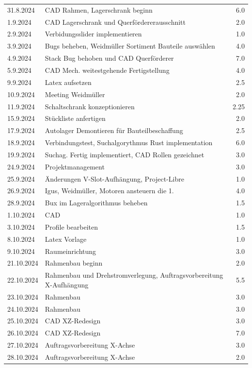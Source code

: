 \begin{longtable}{|l|p{10cm}|r|}
31.8.2024	&CAD Rahmen, Lagerschrank beginn	&6.0\\
1.9.2024	&CAD Lagerschrank und Querfördererausschnitt	&2.0\\
2.9.2024	&Verbidungsslider implementieren	&1.0\\
3.9.2024	&Bugs beheben, Weidmüller Sortiment Bauteile auswählen	&4.0\\
4.9.2024	&Stack Bug behoben und CAD Querförderer	&7.0\\
5.9.2024	&CAD Mech. weitestgehende Fertigstellung	&4.0\\
9.9.2024	&Latex aufsetzen	&2.5\\
10.9.2024	&Meeting Weidmüller&	2.0	\\
11.9.2024	&Schaltschrank konzeptionieren &2.25\\
15.9.2024	&Stückliste anfertigen	&2.0\\

17.9.2024	&Autolager Demontieren für Bauteilbeschaffung&	2.5\\
18.9.2024	&Verbindungstest, Suchalgorythmus Rust implementation &6.0\\
19.9.2024	&Suchag. Fertig implementiert, CAD Rollen gezeichnet	&3.0\\

24.9.2024	&Projektmanagement&	3.0\\
25.9.2024	&Änderungen V-Slot-Aufhängung, Project-Libre	&1.0\\

26.9.2024	&Igus, Weidmüller, Motoren ansteuern die 1.&	4.0\\
28.9.2024	&Bux im Lageralgorithmus beheben	&1.5\\

1.10.2024	&CAD	&1.0\\
3.10.2024	&Profile bearbeiten	&1.5\\
8.10.2024	&Latex Vorlage	&1.0\\
9.10.2024	&Raumeinrichtung&	3.0\\
21.10.2024	&Rahmenbau beginn&	2.0\\
22.10.2024	&Rahmenbau und Drehstromverlegung, Auftragsvorbereitung X-Aufhängung &5.5\\
23.10.2024	&Rahmenbau	&3.0\\
24.10.2024	&Rahmenbau	&3.0\\
25.10.2024	&CAD XZ-Redesign	&3.0	\\
26.10.2024	&CAD XZ-Redesign	&7.0	\\
27.10.2024	&Auftragsvorbereitung X-Achse	&3.0\\
28.10.2024	&Auftragsvorbereitung X-Achse	&2.0	\\


\end{longtable}
